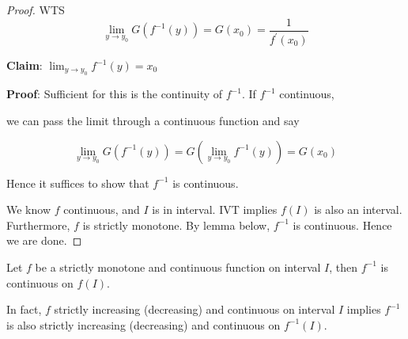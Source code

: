 \begin{proof}
    WTS 
    \[
        \lim_{y \to y_{0}} G \left( f^{-1}(y) \right) 
        = 
        G(x_0)
        = \frac{1}{f^{\prime}(x_0)}
    \]

    \textbf{Claim}: $\lim_{y \to y_{0}} f^{-1}(y) = x_0$

    \textbf{Proof}: 
    Sufficient for this is the continuity of $f^{-1}$.
    If $f^{-1}$ continuous, 

    we can pass the limit through a
    continuous function and say
    
    \[
        \lim_{y \to y_0} G \left( f^{-1}(y) \right)  
        = G \left( 
            \lim_{y \to y_{0}} f^{-1}(y)
         \right) 
         = G(x_{0})
    \]

    Hence it suffices to show that $f^{-1}$
    is continuous.
    \medskip

    We know $f$ continuous, and $I$ is in interval.
    IVT implies $f(I)$ is also an interval. 
    Furthermore, $f$ is strictly monotone.
    By lemma below, $f^{-1}$ is continuous.
    Hence we are done.
\end{proof}

\begin{lemma}
    Let $f$ be a strictly monotone and continuous function 
    on interval $I$, then
    $f^{-1}$ is continuous on $f(I)$.
    \medskip

    In fact, $f$ strictly increasing (decreasing)
    and continuous on interval $I$
    implies $f^{-1}$
    is also strictly
    increasing (decreasing)
    and continuous on $f^{-1}(I)$.
\end{lemma}


